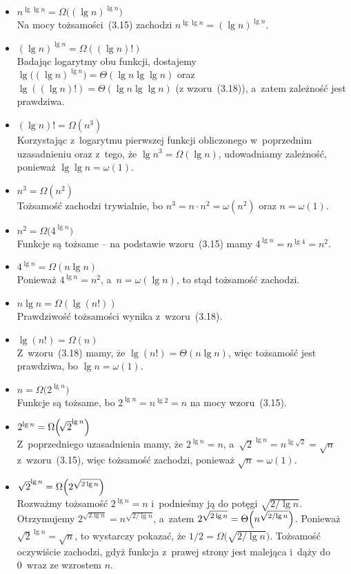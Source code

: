 \begin{itemize}
\item $n^{\lg\lg n}=\Omega\bigl((\lg n)^{\lg n}\bigr)$ \\
	Na mocy tożsamości~(3.15) zachodzi $n^{\lg\lg n}=(\lg n)^{\lg n}$.
\item $(\lg n)^{\lg n}=\Omega((\lg n)!)$ \\
	Badając logarytmy obu funkcji, dostajemy $\lg\bigl((\lg n)^{\lg n}\bigr)=\Theta(\lg n\lg\lg n)$ oraz $\lg((\lg n)!)=\Theta(\lg n\lg\lg n)$ (z wzoru~(3.18)), a~zatem zależność jest prawdziwa.
\item $(\lg n)!=\Omega(n^3)$ \\
	Korzystając z~logarytmu pierwszej funkcji obliczonego w~poprzednim uzasadnieniu oraz z~tego, że $\lg n^3=\Omega(\lg n)$, udowadniamy zależność, ponieważ $\lg\lg n=\omega(1)$.
\item $n^3=\Omega(n^2)$ \\
	Tożsamość zachodzi trywialnie, bo $n^3=n\cdot n^2=\omega(n^2)$ oraz $n=\omega(1)$.
\item $n^2=\Omega\bigl(4^{\lg n}\bigr)$ \\
	Funkcje są tożsame -- na podstawie wzoru~(3.15) mamy $4^{\lg n}=n^{\lg4}=n^2$.
\item $4^{\lg n}=\Omega(n\lg n)$ \\
	Ponieważ $4^{\lg n}=n^2$, a~$n=\omega(\lg n)$, to stąd tożsamość zachodzi.
\item $n\lg n=\Omega(\lg(n!))$ \\
	Prawdziwość tożsamości wynika z~wzoru~(3.18).
\item $\lg(n!)=\Omega(n)$ \\
	Z~wzoru~(3.18) mamy, że $\lg(n!)=\Theta(n\lg n)$, więc tożsamość jest prawdziwa, bo $\lg n=\omega(1)$.
\item $n=\Omega\bigl(2^{\lg n}\bigr)$ \\
	Funkcje są tożsame, bo $2^{\lg n}=n^{\lg2}=n$ na mocy wzoru~(3.15).
\item $2^{\lg n}=\Omega\Bigl(\!\sqrt{2}^{\lg n}\Bigr)$ \\
	Z~poprzedniego uzasadnienia mamy, że $2^{\lg n}=n$, a~$\sqrt{2}^{\lg n}=n^{\lg\sqrt{2}}=\sqrt{n}$ z~wzoru~(3.15), więc tożsamość zachodzi, ponieważ $\sqrt{n}=\omega(1)$.
\item $\sqrt{2}^{\lg n}=\Omega\Bigl(2^{\sqrt{2\lg n}}\Bigr)$ \\
	Rozważmy tożsamość $2^{\lg n}=n$ i~podnieśmy ją do potęgi $\sqrt{2/\!\lg n}$. Otrzymujemy $2^{\sqrt{2\lg n}}=n^{\sqrt{2/\!\lg n}}$, a~zatem $2^{\sqrt{2\lg n}}=\Theta\Bigl(n^{\sqrt{2/\!\lg n}}\Bigr)$. Ponieważ $\sqrt{2}^{\lg n}=\sqrt{n}$, to wystarczy pokazać, że $1/2=\Omega\bigl(\!\sqrt{2/\!\lg n}\bigr)$. Tożsamość oczywiście zachodzi, gdyż funkcja z~prawej strony jest malejąca i~dąży do 0~wraz ze wzrostem $n$.

\end{itemize}
